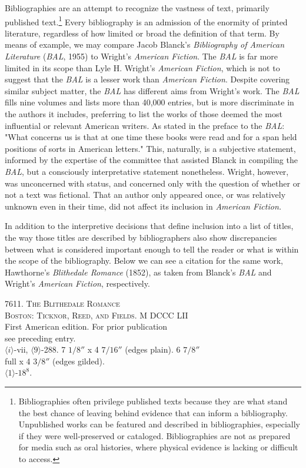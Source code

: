 Bibliographies are an attempt to recognize the vastness of text, primarily published text.\footnote{Bibliographies often privilege published texts because they are what stand the best chance of leaving behind evidence that can inform a bibliography. Unpublished works can be featured and described in bibliographies, especially if they were well-preserved or cataloged. Bibliographies are not as prepared for media such as oral histories, where physical evidence is lacking or difficult to access.} Every bibliography is an admission of the enormity of printed literature, regardless of how limited or broad the definition of that term. By means of example, we may compare Jacob Blanck's \textit{Bibliography of American Literature} (\textit{BAL}, 1955) to Wright's \textit{American Fiction}. The \textit{BAL} is far more limited in its scope than Lyle H. Wright's \textit{American Fiction}, which is not to suggest that the \textit{BAL} is a lesser work than \textit{American Fiction}. Despite covering similar subject matter, the \textit{BAL} has different aims from Wright's work. The \textit{BAL} fills nine volumes and lists more than 40,000 entries, but is more discriminate in the authors it includes, preferring to list the works of those deemed the most influential or relevant American writers. As stated in the preface to the \textit{BAL}: "What concerns us is that at one time these books were read and for a span held positions of sorts in American letters."\autocite[xi]{blanck_bibliography_1955} This, naturally, is a subjective statement, informed by the expertise of the committee that assisted Blanck in compiling the \textit{BAL}, but a consciously interpretative statement nonetheless. Wright, however, was unconcerned with status, and concerned only with the question of whether or not a text was fictional. That an author only appeared once, or was relatively unknown even in their time, did not affect its inclusion in \textit{American Fiction.} 

In addition to the interpretive decisions that define inclusion into a list of titles, the way those titles are described by bibliographers also show discrepancies between what is considered important enough to tell the reader or what is within the scope of the bibliography. Below we can see a citation for the same work, Hawthorne's \textit{Blithedale Romance} (1852), as taken from Blanck's \textit{BAL} and Wright's \textit{American Fiction}, respectively.

\begin{displayquote}
\textsc{7611. The Blithedale Romance} \\ 
\textsc{Boston: Ticknor, Reed, and Fields. M DCCC LII}
 \\ First American edition. For prior publication \\ see preceding entry. \\ $\langle i \rangle$-vii, $\langle 9 \rangle$-288. 7 $1/8''$ x 4 $7/16''$ (edges plain). 6 $7/8''$ \\ full x 4  $3/8''$ (edges gilded). \\ $\langle 1 \rangle$-$18^8$.\autocite[11]{blanck_bibliography_1955}
\end{displayquote}

